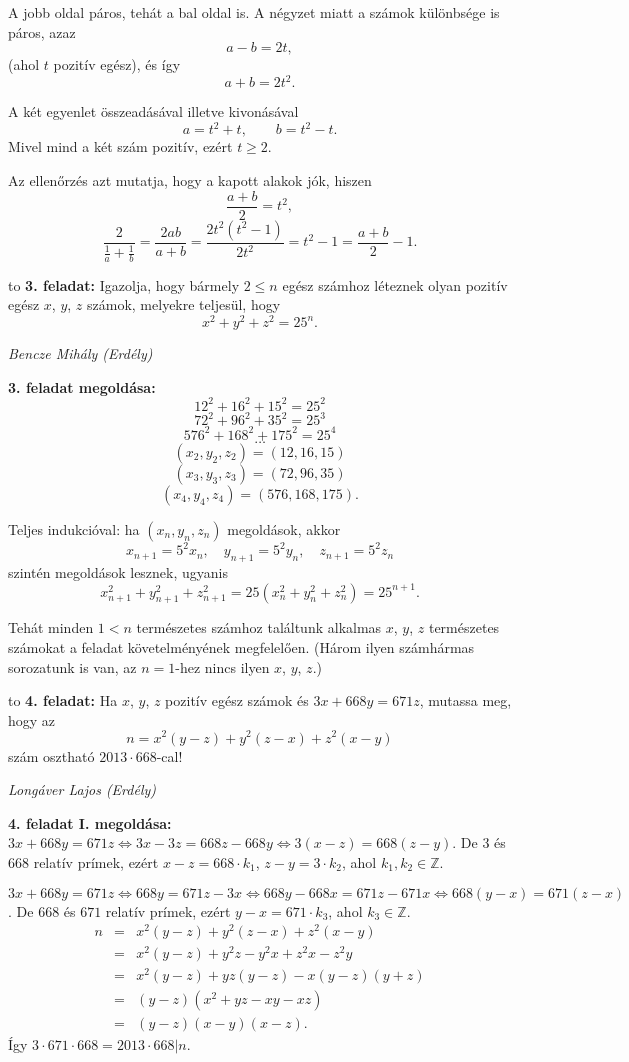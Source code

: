 \documentclass[a4paper,10pt]{article}
\def\ki#1#2{\hfill {\it #1 (#2)}\medskip}
\begin{document}
A jobb oldal páros, tehát a bal oldal is. A négyzet miatt a számok különbsége is páros, azaz
$$a-b =2t,$$ (ahol $t$ pozitív egész), és így $$a+b=2t^2.$$

A két egyenlet összeadásával illetve kivonásával
$$a=t^2+t,\qquad b=t^2-t.$$
Mivel mind a két szám pozitív, ezért $t\ge 2$.

Az ellenőrzés azt mutatja, hogy a kapott alakok jók, hiszen 
$$\frac{a+b}{2}=t^2,$$
$$\frac{2}{\frac{1}{a}+\frac{1}{b}}=\frac{2ab}{a+b}=\frac{2t^2(t^2-1)}{2t^2}=t^2-1=\frac{a+b}{2}-1.$$
\medskip


\hbox to 
{\bf 3. feladat: }
Igazolja, hogy bármely $2 \le n$ egész számhoz léteznek olyan pozitív egész $x$, $y$, $z$ számok, melyekre teljesül, hogy
$$x^2+y^2+z^2=25^n.$$

\ki{Bencze Mihály}{Erdély}\medskip

{\bf 3. feladat megoldása: }
$$12^2+16^2+15^2=25^2$$
$$72^2+96^2+35^2=25^3$$
$$576^2+168^2+175^2=25^4$$
$$\dots$$
$$(x_2, y_2, z_2)=(12, 16, 15)$$
$$(x_3, y_3, z_3)=(72, 96, 35)$$
$$(x_4, y_4, z_4)=(576, 168, 175).$$

Teljes indukcióval: ha $(x_n, y_n, z_n)$ megoldások, akkor
$$x_{n+1}=5^2x_n, \quad y_{n+1}=5^2y_n, \quad z_{n+1}=5^2z_n$$
szintén megoldások lesznek, ugyanis
$$x_{n+1}^2+y_{n+1}^2+z_{n+1}^2=25\left(x_n^2+y_n^2+z_n^2\right)=25^{n+1}.$$

Tehát minden $1<n$ természetes számhoz találtunk alkalmas $x$, $y$, $z$ természetes számokat a feladat követelményének megfelelően. (Három ilyen számhármas sorozatunk is van, az $n=1$-hez nincs ilyen $x$, $y$, $z$.)
\medskip


\hbox to 
{\bf 4. feladat: }
Ha $x$, $y$, $z$ pozitív egész számok és $3x+668y=671z$, mutassa meg, hogy az $$n=x^2(y-z)+y^2(z-x)+z^2(x-y)$$ szám osztható $2013\cdot 668$-cal!

\ki{Longáver Lajos}{Erdély}\medskip

{\bf 4. feladat I. megoldása: }
$3x+668y=671z\Leftrightarrow 3x-3z = 668z-668y \Leftrightarrow 3(x-z)=668(z-y)$.
De $3$ és $668$ relatív prímek, ezért $x-z=668\cdot k_1$, $z-y=3\cdot k_2$, ahol $k_1, k_2 \in \mathbb{Z}$.

$3x+668y=671z\Leftrightarrow 668y=671z-3x \Leftrightarrow 668y-668x=671z-671x\Leftrightarrow 668(y-x)=671(z-x)$.
De $668$ és $671$ relatív prímek, ezért $y-x=671\cdot k_3$, ahol $k_3 \in \mathbb{Z}$.
\begin{eqnarray*}
n &=& x^2(y-z)+y^2(z-x)+z^2(x-y) \\ 
&=& x^2(y-z)+y^2z-y^2x+z^2x-z^2y \\
&=& x^2(y-z)+yz(y-z)-x(y-z)(y+z) \\
&=& (y-z)(x^2+yz-xy-xz) \\
&=& (y-z)(x-y)(x-z). 
\end{eqnarray*}
Így $3\cdot 671\cdot 668=2013\cdot 668 | n$.
\end{document}
